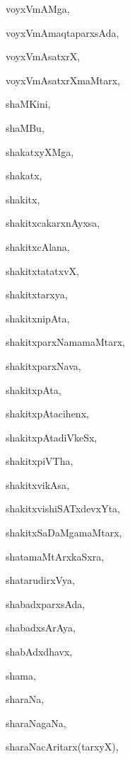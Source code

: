 \begin{multicols}{2}
{voyxVmAMga}, \pageref{voyxVmAMga}

{voyxVmAmaqtaparxsAda}, \pageref{voyxVmAmaqtaparxsAda}

{voyxVmAsatxrX}, \pageref{voyxVmAsatxrX}

{voyxVmAsatxrXmaMtarx}, \pageref{voyxVmAsatxrXmaMtarx}

{shaMKini}, \pageref{shaMKini}

{shaMBu}, \pageref{shaMBu}

{shakatxyXMga}, \pageref{shakatxyXMga}

{shakatx}, \pageref{shakatx}

{shakitx}, \pageref{shakitx}

{shakitxcakarxnAyxsa}, \pageref{shakitxcakarxnAyxsa}

{shakitxcAlana}, \pageref{shakitxcAlana}

{shakitxtatatxvX}, \pageref{shakitxtatatxvX}

{shakitxtarxya}, \pageref{shakitxtarxya}

{shakitxnipAta}, \pageref{shakitxnipAta}

{shakitxparxNamamaMtarx}, \pageref{shakitxparxNamamaMtarx}

{shakitxparxNava}, \pageref{shakitxparxNava}

{shakitxpAta}, \pageref{shakitxpAta}

{shakitxpAtacihenx}, \pageref{shakitxpAtacihenx}

{shakitxpAtadiVkeSx}, \pageref{shakitxpAtadiVkeSx}

{shakitxpiVTha}, \pageref{shakitxpiVTha}

{shakitxvikAsa}, \pageref{shakitxvikAsa}

{shakitxvishiSATxdevxYta}, \pageref{shakitxvishiSATxdevxYta}

{shakitxSaDaMgamaMtarx}, \pageref{shakitxSaDaMgamaMtarx}

{shatamaMtArxkaSxra}, \pageref{shatamaMtArxkaSxra}

{shatarudirxVya}, \pageref{shatarudirxVya}

{shabadxparxsAda}, \pageref{shabadxparxsAda}

{shabadxsArAya}, \pageref{shabadxsArAya}

{shabAdxdhavx}, \pageref{shabAdxdhavx}

{shama}, \pageref{shama}

{sharaNa}, \pageref{sharaNa}

{sharaNagaNa}, \pageref{sharaNagaNa}

{sharaNacAritarx(tarxyX)}, \pageref{sharaNacAritarxtarxyX}


\end{multicols}
